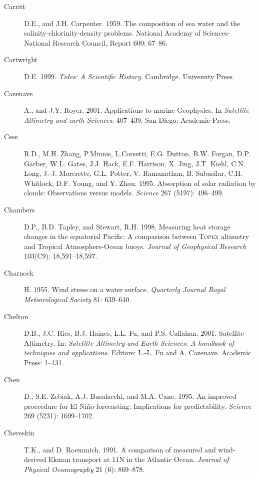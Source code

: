 \begin{description}
\item [Carritt]D.E., and J.H. Carpenter. 1959. The composition of sea
  water and the salinity-chlorinity-density problems. National Academy
  of Sciences-National Research Council, Report 600: 67--86.

\item [Cartwright]D.E. 1999. \textit{Tides: A Scientific
  History}. Cambridge, University Press.
	
\item [Cazenave]A., and J.Y. Royer. 2001. Applications to marine
  Geophysics. In \textit{Satellite Altimetry and earth
    Sciences}. 407--439. San Diego: Academic Press.

\item [Cess]R.D., M.H. Zhang, P.Minnis, L.Corsetti, E.G. Dutton,
  B.W. Forgan, D.P. Garber, W.L. Gates, J.J. Hack, E.F. Harrison,
  X. Jing, J.T. Kiehl, C.N.  Long, J.-J. Morcrette, G.L. Potter,
  V. Ramanathan, B. Subasilar, C.H. Whitlock, D.F. Young, and
  Y. Zhou. 1995. Absorption of solar radiation by clouds: Observations
  versus models. \textit{Science} 267 (5197): 496--499.

\item[Chambers]D.P., B.D. Tapley, and Stewart, R.H. 1998. Measuring
  heat storage changes in the equatorial Pacific: A comparison between
  \textsc{Topex} altimetry and Tropical Atmo\-sphere-Ocean
  buoys. \textit{Journal of Geophysical Research} 103(C9):
  18,591--18,597.

\item [Charnock]H. 1955. Wind stress on a water
  surface. \textit{Quarterly Journal Royal Meteorological Society} 81:
  639--640.

\item [Chelton]D.B., J.C. Ries, B.J. Haines, L.L. Fu, and
  P.S. Callahan. 2001. Satellite Altimetry. In: \textit{Satellite
    Altimetry and Earth Sciences: A handbook of techniques and
    applications}. Editors: L.-L. Fu and A. Cazenave. Academic Press:
  1--131.
	
\item [Chen]D., S.E. Zebiak, A.J. Busalacchi, and M.A. Cane. 1995. An
  improved proceedure for El Ni\~{n}o forecasting: Implications for
  predictability.  \textit{Science} 269 (5231): 1699--1702.

\item [Chereskin]T.K., and D. Roemmich. 1991. A comparison of measured
  and wind-derived Ekman transport at 11\degrees N in the Atlantic
  Ocean.  \textit{Journal of Physical Oceanography} 21 (6): 869--878.


\end{description}
